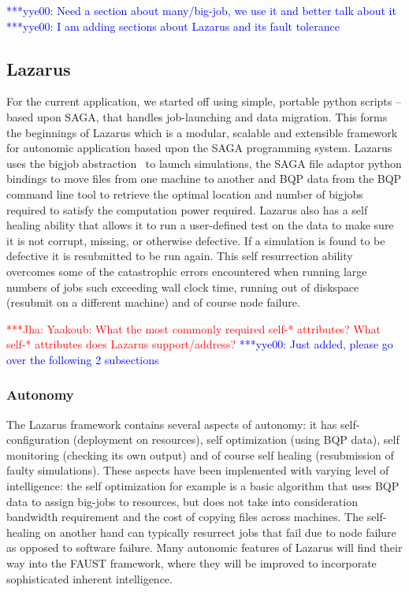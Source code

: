 \documentclass[conference,final]{IEEEtran}
\newcommand{\jhanote}[1]{ {\textcolor{red} { ***Jha: #1 }}}
\newcommand{\yyenote}[1]{ {\textcolor{blue} { ***yye00: #1 }}}
\begin{document}
\yyenote{Need a section about many/big-job, we use it and better talk about it}
\yyenote{I am adding sections about Lazarus and its fault tolerance}

\subsection{Lazarus}
For the current application, we started off using simple, portable
python scripts -- based upon SAGA, that handles job-launching and data
migration. This forms the beginnings of Lazarus which is a modular,
scalable and extensible framework for autonomic application based upon
the SAGA programming system.  Lazarus uses the bigjob
abstraction~\cite{ICCS_paper, saga_royalsoc} to launch simulations,
the SAGA file adaptor python bindings to move files from one machine
to another and BQP data from the BQP command line tool to retrieve the
optimal location and number of bigjobs required to satisfy the
computation power required. Lazarus also has a self healing ability
that allows it to run a user-defined test on the data to make sure it
is not corrupt, missing, or otherwise defective. If a simulation is
found to be defective it is resubmitted to be run again. This self
resurrection ability overcomes some of the catastrophic errors
encountered when running large numbers of jobs such exceeding wall
clock time, running out of diskspace (resubmit on a different machine)
and of course node failure.

\jhanote{Yaakoub: What the most commonly required self-* attributes?
  What self-* attributes does Lazarus support/address?}
\yyenote{Just added, please go over the following 2 subsections}

\subsubsection{Autonomy}
The Lazarus framework contains several aspects of autonomy: it has self-configuration (deployment on resources), self optimization (using BQP data), self monitoring (checking
its own output) and of course self healing (resubmission of faulty simulations). These
aspects have been implemented with varying level of intelligence: the self optimization
for example is a basic algorithm that uses BQP data to assign big-jobs to resources,
but does not take into consideration bandwidth requirement and the cost of copying files
across machines. The self-healing on another hand can typically resurrect jobs
that fail due to node failure as opposed to software failure. Many autonomic features
of Lazarus will find their way into the FAUST framework, where they will be improved to
incorporate sophisticated inherent intelligence.
\end{document}
